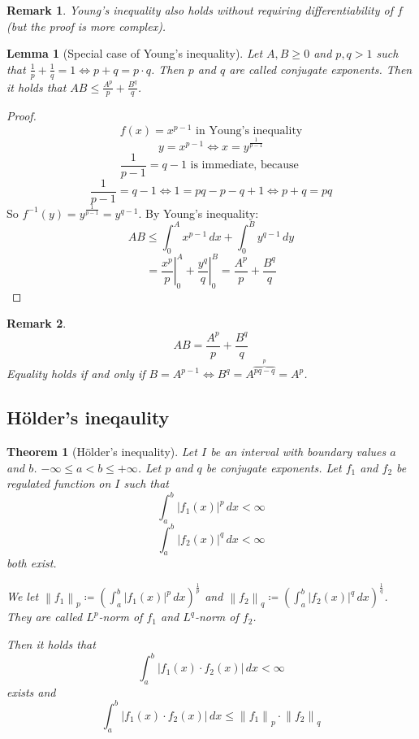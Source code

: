 \documentclass{article}
\newtheorem{theorem}{Theorem}  \numberwithin{theorem}{section}
\newtheorem{lemma}{Lemma}  \numberwithin{lemma}{section}
\newtheorem{remark}{Remark}  \numberwithin{remark}{section}
\newcommand{\norm}[1]{\left\|#1\right\|}
\newcommand{\card}[1]{\left|#1\right|}
\begin{document}
\begin{remark}
  Young's inequality also holds without requiring differentiability of $f$ (but the proof is more complex).
\end{remark}

\begin{lemma}[Special case of Young's inequality] %
  \label{lemma14}
  Let $A, B \geq 0$ and $p,q > 1$ such that $\frac1p + \frac1q = 1 \iff p + q = p \cdot q$.
  Then $p$ and $q$ are called \emph{conjugate exponents}.
  Then it holds that $AB \leq \frac{A^p}{p} + \frac{B^q}{q}$.
\end{lemma}
\begin{proof}
  \[ f(x) = x^{p-1} \text{ in Young's inequality} \]
  \[ y = x^{p-1} \iff x = y^{\frac{1}{p-1}} \]
  \[ \frac{1}{p-1} = q - 1 \text{ is immediate, because } \]
  \[ \frac{1}{p-1} = q - 1 \iff 1 = pq - p - q + 1 \iff p + q = pq \]
  So $f^{-1}(y) = y^{\frac{1}{p-1}} = y^{q - 1}$.
  By Young's inequality:
  \[ AB \leq \int_0^A x^{p-1} \, dx + \int_0^B y^{q - 1} \, dy \]
  \[ = \left.\frac{x^p}{p}\right|_0^A + \left. \frac{y^q}{q} \right|_0^B = \frac{A^p}{p} + \frac{B^q}{q} \]
\end{proof}

\begin{remark}
  \[ AB = \frac{A^p}{p} + \frac{B^q}{q} \]
  Equality holds if and only if $B = A^{p-1} \iff B^q = A^{\overbrace{pq-q}^{p}} = A^p$.
\end{remark}

\subsection{H\"older's ineqaulity}

\begin{theorem}[H\"older's inequality] %
  Let $I$ be an interval with boundary values $a$ and $b$. $-\infty \leq a < b \leq +\infty$.
  Let $p$ and $q$ be conjugate exponents. Let $f_1$ and $f_2$ be regulated function on $I$
  such that
  \[ \int_a^b \card{f_1(x)}^p \, dx < \infty \]
  \[ \int_a^b \card{f_2(x)}^q \, dx < \infty \]
  both exist.

  We let $\norm{f_1}_p \coloneqq \left(\int_a^b \card{f_1(x)}^p \, dx\right)^{\frac1p}$ and $\norm{f_2}_q \coloneqq \left(\int_a^b \card{f_2(x)}^q \, dx\right)^{\frac1q}$.
  They are called $L^p$-norm of $f_1$ and $L^q$-norm of $f_2$.

  Then it holds that
  \[ \int_a^b \card{f_1(x) \cdot f_2(x)} \, dx < \infty \]
  exists and
  \[ \int_a^b \card{f_1(x) \cdot f_2(x)} \, dx \leq \norm{f_1}_p \cdot \norm{f_2}_q \]
\end{theorem}
\end{document}
